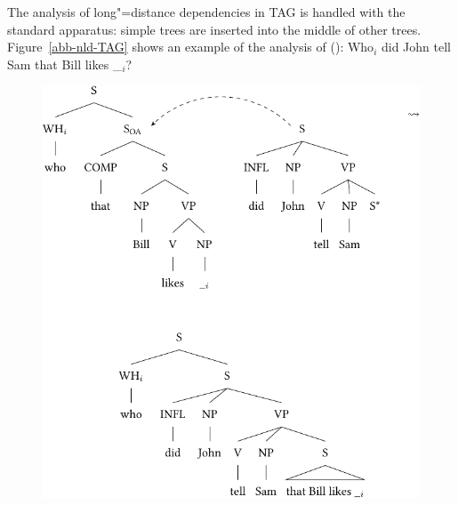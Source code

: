 The analysis of long"=distance dependencies in TAG is handled with the standard apparatus: simple trees are inserted
into the middle of other trees. Figure~\vref{abb-nld-TAG} shows an example of the analysis of ():
\ea
Who$_i$ did John tell Sam that Bill likes \_$_i$?
\z
%
\begin{figure}
\includegraphics{Figures/tag-long-distance-dependencies-crop}

\end{figure}
